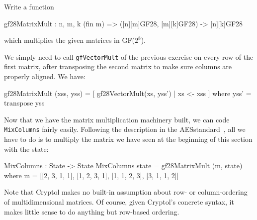 \begin{Exercise}\label{ex:aesmc:3}
Write a function
\begin{code}
  gf28MatrixMult : {n, m, k} (fin m) => ([n][m]GF28, [m][k]GF28) -> [n][k]GF28
\end{code}
which multiplies the given matrices in GF($2^8$)\indGF.
\end{Exercise}
\begin{Answer}
  We simply need to call {\tt gfVectorMult} of the previous exercise
  on every row of the first matrix, after transposing the second
  matrix to make sure columns are properly aligned. We
  have:\indTranspose
\begin{code}
  gf28MatrixMult (xss, yss) = [ gf28VectorMult(xs, yss')
                              | xs <- xss ]
       where yss' = transpose yss
\end{code}
\end{Answer}


\unparagraph Now that we have the matrix multiplication machinery
built, we can code {\tt MixColumns} fairly easily. Following the
description in the AES\indAES standard~\cite[section 5.3.1]{aes}, all
we have to do is to multiply the matrix we have seen at the beginning
of this section with the state:

\begin{code}
  MixColumns : State -> State
  MixColumns state = gf28MatrixMult (m, state)
    where m = [[2, 3, 1, 1],
               [1, 2, 3, 1],
               [1, 1, 2, 3],
               [3, 1, 1, 2]]
\end{code}

Note that Cryptol makes no built-in assumption about row- or
column-ordering of multidimensional matrices.  Of course, given
Cryptol's concrete syntax, it makes little sense to do anything but
row-based ordering.



